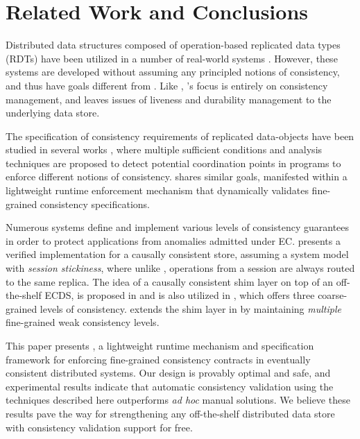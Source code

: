 \section{Related Work and Conclusions}
\label{sec:rel_works}

Distributed data structures composed of operation-based replicated
data types (RDTs) \cite{rdt,crdt} have been utilized in a number of
real-world systems \cite{tango,cassandra}.  However, these systems are
developed without assuming any principled notions of consistency, and
thus have goals different from \tool.  Like \cite{bolton}, \tool's
focus is entirely on consistency management, and leaves issues of
liveness and durability management to the underlying data store.


The specification of consistency requirements of replicated
data-objects have been studied in several works
\cite{autoc,mahsa,bloom}, where multiple sufficient conditions and
analysis techniques are proposed to detect potential coordination
points in programs to enforce different notions of consistency.  \tool
shares similar goals, manifested within a lightweight runtime
enforcement mechanism that dynamically validates fine-grained
consistency specifications.

Numerous systems \cite{geofast,petersen,cbs,chapar,bolton,quelea}
define and implement various levels of consistency guarantees in order
to protect applications from anomalies admitted under EC.
\cite{chapar} presents a verified implementation for a causally
consistent store, assuming a system model with \emph{session
  stickiness}, where unlike \tool, operations from a session are
always routed to the same replica. The idea of a causally consistent
shim layer on top of an off-the-shelf ECDS, is proposed in
\cite{bolton} and is also utilized in \cite{quelea}, which offers
three coarse-grained levels of consistency.  \tool extends the shim
layer in \cite{quelea} by maintaining \emph{multiple} fine-grained
weak consistency levels.

This paper presents \tool, a lightweight runtime mechanism and
specification framework for enforcing fine-grained consistency
contracts in eventually consistent distributed systems.  Our design is
provably optimal and safe, and experimental results indicate that
automatic consistency validation using the techniques described here
outperforms \emph{ad hoc} manual solutions.  We believe these results
pave the way for strengthening any off-the-shelf distributed data
store with consistency validation support for free.



